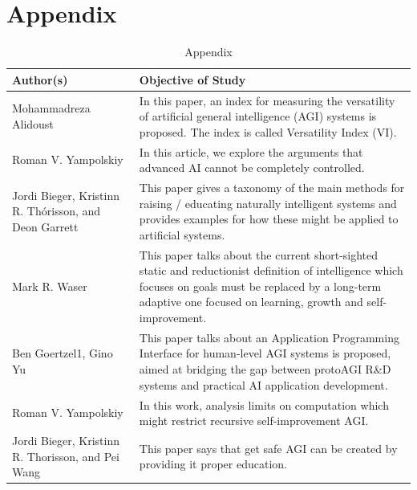 \documentclass{article}
\begin{document}


\section*{Appendix}

\begin{table}
    \caption{Appendix}
    \centering
    \renewcommand{\arraystretch}{3}
    \begin{tabular}{ |p{5cm}|p{10cm}|  }
    \hline
    Author(s) & Objective of Study\\
    \hline
    Mohammadreza Alidoust & In this paper, an index for measuring the versatility of artificial general intelligence (AGI) systems is proposed. The index is called Versatility Index (VI).\\
    
    Roman V. Yampolskiy & In this article, we explore the arguments that advanced AI cannot be completely controlled.\\
    
    Jordi Bieger, Kristinn R. Thórisson, and Deon Garrett & This paper gives a taxonomy of the main methods for raising / educating naturally intelligent systems and provides examples for how these might be applied to artificial systems.\\
    
    Mark R. Waser & This paper talks about the current short-sighted static and reductionist definition of intelligence which focuses on goals must be replaced by a long-term adaptive one focused on learning, growth and self-improvement.\\ 

    Ben Goertzel1, Gino Yu & This paper talks about an Application Programming  Interface for human-level AGI systems is proposed, aimed at bridging the gap between protoAGI R\&D systems and practical AI application development.\\
    
    Roman V. Yampolskiy & In this work, analysis limits on computation which might restrict recursive self-improvement AGI.\\
    
    Jordi Bieger, Kristinn R. Thorisson, and Pei Wang & This paper says that get safe AGI can be created by providing it proper education. \\


\end{tabular}
\end{table}
\end{document}
